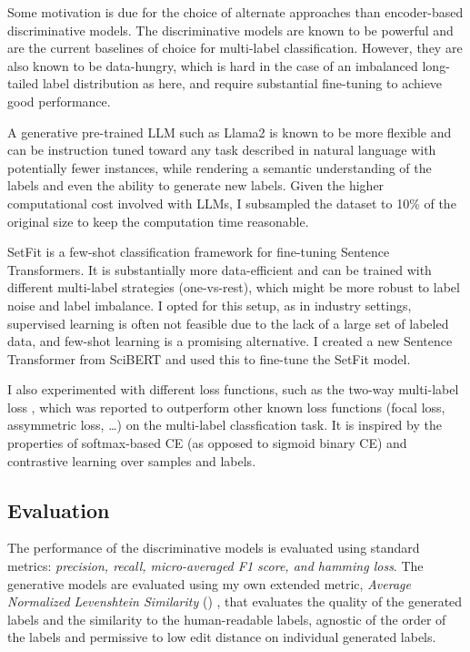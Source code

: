 \documentclass[11pt,letterpaper]{article}
\begin{document}
Some motivation is due for the choice of alternate approaches than encoder-based discriminative models. The discriminative models are known to be powerful and are the current baselines of choice for multi-label classification. However, they are also known to be data-hungry, which is hard in the case of an imbalanced long-tailed label distribution as here, and require substantial fine-tuning to achieve good performance.

A generative pre-trained LLM such as Llama2 \cite{touvron2023llama} is known to be more flexible and can be instruction tuned toward any task described in natural language with potentially fewer instances,
while rendering a semantic understanding of the labels and even the ability to generate new labels. Given the higher computational cost involved with LLMs, I subsampled the dataset to 10\% of the original size to keep the computation time reasonable.

SetFit \cite{tunstall2022efficient} is a few-shot classification framework for fine-tuning Sentence Transformers. It is substantially more data-efficient and can be trained with different multi-label strategies (one-vs-rest), which might be more robust to label noise and label imbalance. I opted for this setup, as in industry settings, supervised learning is often not feasible due to the lack of a large set of labeled data, and few-shot learning is a promising alternative. I created a new Sentence Transformer from SciBERT and used this to fine-tune the SetFit model.

I also experimented with different loss functions, such as the two-way multi-label loss \cite{kobayashi2023two}, which was reported to outperform other known loss functions (focal loss, assymmetric loss, \ldots) on the multi-label classfication task. It is inspired by the properties of softmax-based CE (as opposed to sigmoid binary CE) and contrastive learning over samples and labels.

\subsection{Evaluation}

The performance of the discriminative models is evaluated using standard metrics: \textit{precision, recall, micro-averaged F1 score, and hamming loss}.
The generative models are evaluated using my own extended metric, \textit{Average Normalized Levenshtein Similarity} (\ANLS) \cite{VanLandeghem2023dude}, that evaluates the quality of the generated labels and the similarity to the human-readable labels, agnostic of the order of the labels and permissive to low edit distance on individual generated labels.
\end{document}
